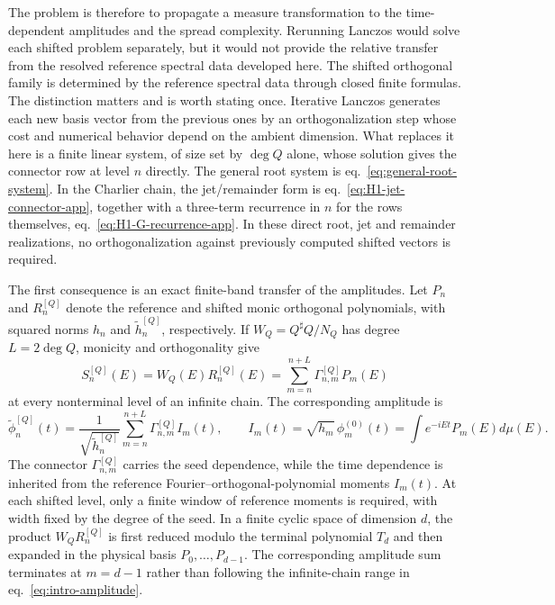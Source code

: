 \documentclass[a4paper,11pt]{article}
\def\dd{d}%
\def\ii{i}%
\def\ee{e}%
\theoremstyle{definition}
\theoremstyle{remark}
\newcommand{\dd}{\mathrm d}
\newcommand{\ii}{\mathrm i}
\newcommand{\ee}{\mathrm e}
\newcommand{\tphi}{\widetilde\phi}
\newcommand{\thh}{\widetilde h}
\newcommand{\Qsh}{Q^{\sharp}}
\begin{document}
The problem is therefore to propagate a measure transformation to the time-dependent amplitudes and the spread complexity.  Rerunning Lanczos would solve each shifted problem separately, but it would not provide the relative transfer from the resolved reference spectral data developed here.
The shifted orthogonal family is determined by the reference spectral data through closed finite
formulas. The distinction matters and is worth stating once. Iterative Lanczos generates
each new basis vector from the previous ones by an orthogonalization step whose cost and numerical
behavior depend on the ambient dimension. What replaces it here is a finite linear system, of size
set by $\deg Q$ alone, whose solution gives the connector row at level $n$ directly. The general root system is eq.~\eqref{eq:general-root-system}. In the Charlier chain, the jet/remainder form is eq.~\eqref{eq:H1-jet-connector-app},
together with a three-term recurrence in $n$ for the rows themselves,
eq.~\eqref{eq:H1-G-recurrence-app}. In these direct root, jet and remainder realizations, no
orthogonalization against previously computed shifted vectors is required.

The first consequence is an exact finite-band transfer of the amplitudes. Let $P_n$ and $R_n^{[Q]}$ denote the reference and shifted monic orthogonal polynomials, with squared norms $h_n$ and $\thh_n^{[Q]}$, respectively. If
$W_Q=\Qsh Q/N_Q$ has degree $L=2\deg Q$, monicity and orthogonality give
\begin{equation}
   S_n^{[Q]}(E)=W_Q(E)R_n^{[Q]}(E)
   =\sum_{m=n}^{n+L}\Gamma_{n,m}^{[Q]}P_m(E)
   \label{eq:intro-finite-band}
\end{equation}
at every nonterminal level of an infinite chain. The corresponding amplitude is
\begin{equation}
   \tphi_n^{[Q]}(t)=
   \frac{1}{\sqrt{\thh_n^{[Q]}}}
   \sum_{m=n}^{n+L}\Gamma_{n,m}^{[Q]}I_m(t),
   \qquad
   I_m(t)=\sqrt{h_m}\,\phi_m^{(0)}(t)
   =\int\ee^{-\ii Et}P_m(E)\dd\mu(E).
   \label{eq:intro-amplitude}
\end{equation}
The connector $\Gamma_{n,m}^{[Q]}$ carries the seed dependence, while the time dependence is inherited from the reference Fourier--orthogonal-polynomial moments $I_m(t)$. At each shifted level, only a finite window of reference moments is required, with width fixed by the degree of the seed. In a finite cyclic space of dimension $d$, the product $W_QR_n^{[Q]}$ is first reduced modulo the terminal polynomial $T_d$ and then expanded in the physical basis $P_0,\ldots,P_{d-1}$. The corresponding amplitude sum terminates at $m=d-1$ rather than following the infinite-chain range in eq.~\eqref{eq:intro-amplitude}.
\end{document}

